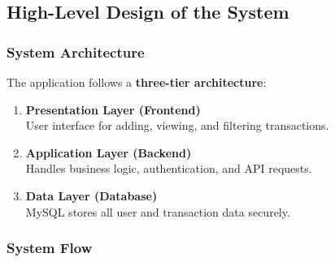 \documentclass[a4paper,12pt]{article}
\begin{document}
\subsection{High-Level Design of the System}

\subsubsection{System Architecture}

The application follows a \textbf{three-tier architecture}:

\begin{enumerate}
    \item \textbf{Presentation Layer (Frontend)} \\
    User interface for adding, viewing, and filtering transactions.
    
    \item \textbf{Application Layer (Backend)} \\
    Handles business logic, authentication, and API requests.
    
    \item \textbf{Data Layer (Database)} \\
    MySQL stores all user and transaction data securely.
\end{enumerate}

\subsubsection{System Flow}
\end{document}
